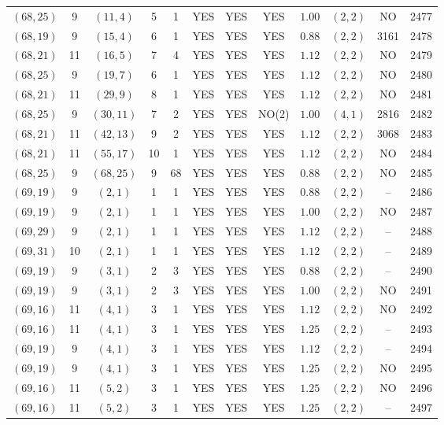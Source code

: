 \begin{longtable}{|c|c|c|c|c|c|c|c|c|c|c|c|}
$(68,25)$ & 9 & $(11,4)$ & 5 & 1 & YES & YES & YES & $1.00$ & $(2,2)$ & NO & 2477\\
$(68,19)$ & 9 & $(15,4)$ & 6 & 1 & YES & YES & YES & $0.88$ & $(2,2)$ & 3161 & 2478\\
$(68,21)$ & 11 & $(16,5)$ & 7 & 4 & YES & YES & YES & $1.12$ & $(2,2)$ & NO & 2479\\
$(68,25)$ & 9 & $(19,7)$ & 6 & 1 & YES & YES & YES & $1.12$ & $(2,2)$ & NO & 2480\\
$(68,21)$ & 11 & $(29,9)$ & 8 & 1 & YES & YES & YES & $1.12$ & $(2,2)$ & NO & 2481\\
$(68,25)$ & 9 & $(30,11)$ & 7 & 2 & YES & YES & NO(2) & $1.00$ & $(4,1)$ & 2816 & 2482\\
$(68,21)$ & 11 & $(42,13)$ & 9 & 2 & YES & YES & YES & $1.12$ & $(2,2)$ & 3068 & 2483\\
$(68,21)$ & 11 & $(55,17)$ & 10 & 1 & YES & YES & YES & $1.12$ & $(2,2)$ & NO & 2484\\
$(68,25)$ & 9 & $(68,25)$ & 9 & 68 & YES & YES & YES & $0.88$ & $(2,2)$ & NO & 2485\\
$(69,19)$ & 9 & $(2,1)$ & 1 & 1 & YES & YES & YES & $0.88$ & $(2,2)$ & -- & 2486\\
$(69,19)$ & 9 & $(2,1)$ & 1 & 1 & YES & YES & YES & $1.00$ & $(2,2)$ & NO & 2487\\
$(69,29)$ & 9 & $(2,1)$ & 1 & 1 & YES & YES & YES & $1.12$ & $(2,2)$ & -- & 2488\\
$(69,31)$ & 10 & $(2,1)$ & 1 & 1 & YES & YES & YES & $1.12$ & $(2,2)$ & -- & 2489\\
$(69,19)$ & 9 & $(3,1)$ & 2 & 3 & YES & YES & YES & $0.88$ & $(2,2)$ & -- & 2490\\
$(69,19)$ & 9 & $(3,1)$ & 2 & 3 & YES & YES & YES & $1.00$ & $(2,2)$ & NO & 2491\\
$(69,16)$ & 11 & $(4,1)$ & 3 & 1 & YES & YES & YES & $1.12$ & $(2,2)$ & NO & 2492\\
$(69,16)$ & 11 & $(4,1)$ & 3 & 1 & YES & YES & YES & $1.25$ & $(2,2)$ & -- & 2493\\
$(69,19)$ & 9 & $(4,1)$ & 3 & 1 & YES & YES & YES & $1.12$ & $(2,2)$ & -- & 2494\\
$(69,19)$ & 9 & $(4,1)$ & 3 & 1 & YES & YES & YES & $1.25$ & $(2,2)$ & NO & 2495\\
$(69,16)$ & 11 & $(5,2)$ & 3 & 1 & YES & YES & YES & $1.25$ & $(2,2)$ & NO & 2496\\
$(69,16)$ & 11 & $(5,2)$ & 3 & 1 & YES & YES & YES & $1.25$ & $(2,2)$ & -- & 2497\\

\end{longtable}
